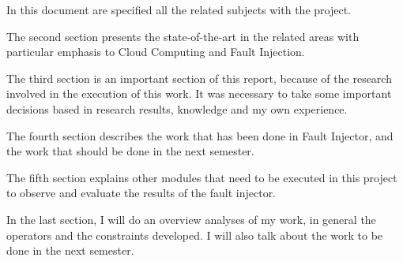 In this document are specified all the related subjects with the project.

The second section presents the state-of-the-art in the related areas with particular emphasis to Cloud Computing and Fault Injection.

The third section is an important section of this report, because of the research involved in the execution of this work. It was necessary to take some important decisions based in research results, knowledge and my own experience.

The fourth section describes the work that has been done in Fault Injector, and the work that should be done in the next semester.

The fifth section explains other modules that need to be executed in this project to observe and evaluate the results of the fault injector.

In the last section, I will do an overview analyses of my work, in general the operators and the constraints developed. I will also talk about the work to be done in the next semester.

